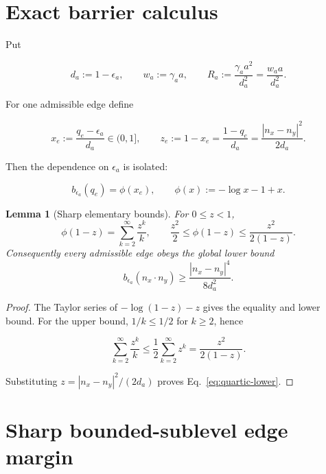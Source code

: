 \documentclass[11pt]{article}
\numberwithin{equation}{section}
\newtheorem{lemma}[theorem]{Lemma}
\theoremstyle{definition}
\theoremstyle{remark}
\begin{document}
\section{Exact barrier calculus}

Put

\begin{equation}
 d_a:=1-\epsilon_a,\qquad
 w_a:=\gamma_a a,\qquad
 R_a:=\frac{\gamma_a a^2}{d_a^2}
      =\frac{w_a a}{d_a^2}.
 \label{eq:three-scales}
\end{equation}

For one admissible edge define

\begin{equation}
 x_e:=\frac{q_e-\epsilon_a}{d_a}\in(0,1],
 \qquad
 z_e:=1-x_e
 =\frac{1-q_e}{d_a}
 =\frac{|n_x-n_y|^2}{2d_a}.
 \label{eq:xz}
\end{equation}

Then the dependence on $\epsilon_a$ is isolated:

\begin{equation}
 b_{\epsilon_a}(q_e)=\phi(x_e),\qquad
 \phi(x):=-\log x-1+x.
 \label{eq:phi}
\end{equation}

\begin{lemma}[Sharp elementary bounds]
For $0\le z<1$,
\begin{equation}
 \phi(1-z)=\sum_{k=2}^{\infty}\frac{z^k}{k},\qquad
 \frac{z^2}{2}\le\phi(1-z)
 \le\frac{z^2}{2(1-z)}.
 \label{eq:phi-bounds}
\end{equation}
Consequently every admissible edge obeys the global lower bound
\begin{equation}
 \boxed{
 b_{\epsilon_a}(n_x\cdot n_y)
 \ge\frac{|n_x-n_y|^4}{8d_a^2}.}
 \label{eq:quartic-lower}
\end{equation}
\end{lemma}

\begin{proof}
The Taylor series of $-\log(1-z)-z$ gives the equality and lower bound.
For the upper bound, $1/k\le1/2$ for $k\ge2$, hence

\[
 \sum_{k=2}^{\infty}\frac{z^k}{k}
 \le\frac12\sum_{k=2}^{\infty}z^k
 =\frac{z^2}{2(1-z)}.
\]

Substituting $z=|n_x-n_y|^2/(2d_a)$ proves
Eq.~\eqref{eq:quartic-lower}.
\end{proof}

\section{Sharp bounded-sublevel edge margin}
\end{document}
